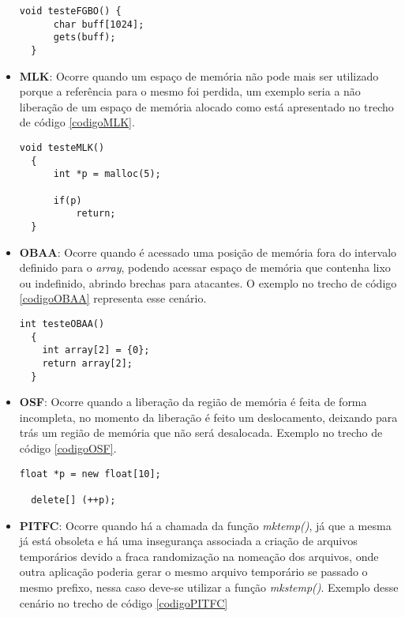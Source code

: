 \begin{itemize}
    \begin{lstlisting}[caption={Código exemplo FGBO}, label=codigoFGBO]
  void testeFGBO() {
      char buff[1024];
      gets(buff);
  } 
    \end{lstlisting}
  \item \textbf{MLK}: Ocorre quando um espaço de memória não pode mais ser utilizado porque a referência para o mesmo foi 
    perdida, um exemplo seria a não liberação de um espaço de memória alocado como está apresentado no trecho de código 
    \ref{codigoMLK}.

    \begin{lstlisting}[caption={Código exemplo MLK}, label=codigoMLK]
  void testeMLK()
  {
      int *p = malloc(5);

      if(p) 
          return;
  }
    \end{lstlisting}
  \item \textbf{OBAA}: Ocorre quando é acessado uma posição de memória fora do intervalo definido para o \textit{array}, 
    podendo acessar espaço de memória que contenha lixo ou indefinido, abrindo brechas para atacantes. O exemplo no trecho de 
    código \ref{codigoOBAA} representa esse cenário.

    \begin{lstlisting}[caption={Código exemplo OBAA}, label=codigoOBAA]
  int testeOBAA()
  {
    int array[2] = {0};
    return array[2];
  }
    \end{lstlisting}
  \item \textbf{OSF}: Ocorre quando a liberação da região de memória é feita de forma incompleta, no momento da liberação é 
    feito um deslocamento, deixando para trás um região de memória que não será desalocada. Exemplo no trecho de código 
    \ref{codigoOSF}.

    \begin{lstlisting}[caption={Código exemplo OSF}, label=codigoOSF]
  float *p = new float[10];

  delete[] (++p);
    \end{lstlisting}
  \item \textbf{PITFC}: Ocorre quando há a chamada da função \textit{mktemp()}, já que a mesma já está obsoleta e há uma 
    insegurança associada a criação de arquivos temporários devido a fraca randomização na nomeação dos arquivos, onde outra
    aplicação poderia gerar o mesmo arquivo temporário se passado o mesmo prefixo, nessa caso deve-se utilizar a função 
    \textit{mkstemp()}. Exemplo desse cenário no trecho de código \ref{codigoPITFC}


\end{itemize}
